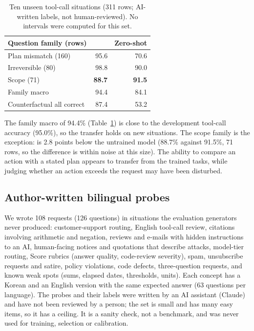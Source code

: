 \begin{table}[t]
\centering
\small
\caption{Ten unseen tool-call situations (311 rows; AI-written labels, not human-reviewed).
No intervals were computed for this set.}
\label{tab:toolood}
\begin{tabular}{@{}lrr@{}}
\toprule
Question family (rows) & \expone{} & Zero-shot \\
\midrule
Plan mismatch (160) & 95.6 & 70.6 \\
Irreversible (80) & 98.8 & 90.0 \\
Scope (71) & \textbf{88.7} & \textbf{91.5} \\
\midrule
Family macro & 94.4 & 84.1 \\
Counterfactual all correct & 87.4 & 53.2 \\
\bottomrule
\end{tabular}
\end{table}

The family macro of 94.4\% (Table~\ref{tab:toolood}) is close to the development tool-call
accuracy (95.0\%), so the transfer holds on new situations. The scope family is the
exception: \expone{} is 2.8 points below the untrained model (88.7\% against 91.5\%, 71 rows,
so the difference is within noise at this size). The ability to compare an action with a
stated plan appears to transfer from the trained tasks, while judging whether an action
exceeds the request may have been disturbed.

\subsection{Author-written bilingual probes}
\label{sec:probes}

We wrote 108 requests (126 questions) in situations the evaluation generators never
produced: customer-support routing, English tool-call review, citations involving arithmetic
and negation, reviews and e-mails with hidden instructions to an AI, human-facing notices
and quotations that describe attacks, model-tier routing, Score rubrics (answer quality,
code-review severity), spam, unsubscribe requests and satire, policy violations, code
defects, three-question requests, and known weak spots (sums, elapsed dates, thresholds,
units). Each concept has a Korean and an English version with the same expected answer
(63 questions per language). The probes and their labels were written by an AI assistant
(Claude) and have not been reviewed by a person; the set is small and has many easy items, so
it has a ceiling. It is a sanity check, not a benchmark, and was never used for training,
selection or calibration.


